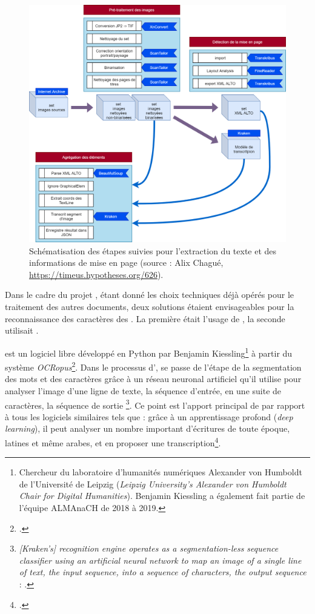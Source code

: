 \begin{figure}[t]
    \centering
    \includegraphics[width=15cm]{img/schema_lse_od2m.png}
    \caption[Schématisation des étapes suivies pour l’extraction du texte et des informations de mise en page]{Schématisation des étapes suivies pour l’extraction du texte et des informations de mise en page (source : Alix Chagué, \url{https://timeus.hypotheses.org/626}).}
    \label{fig:schema_lse_od2m}
\end{figure}

Dans le cadre du projet \timeus, étant donné les choix techniques déjà opérés pour le traitement des autres documents, deux solutions étaient envisageables pour la reconnaissance des caractères des \odm. La première était l'usage de \transkribus{}, la seconde utilisait \kraken{}.

\kraken{} est un logiciel libre développé en Python par Benjamin Kiessling\footnote{Chercheur du laboratoire d'humanités numériques \og Alexander von Humboldt \fg{} de l'Université de Leipzig (\textit{Leipzig  University’s  Alexander  von  Humboldt  Chair for Digital Humanities}). Benjamin Kiessling a également fait partie de l'équipe ALMAnaCH de 2018 à 2019.} à partir du système \textit{OCRopus}\footcite{kiessling}. Dans le processus d'\ocr, \kraken{} se passe de l'étape de la segmentation des mots et des caractères grâce à un \og réseau neuronal artificiel \fg{} qu'il utilise \og pour analyser l'image d'une ligne de texte, la séquence d'entrée, en une suite de caractères, la séquence de sortie \fg{}\footnote{\og \textit{[Kraken's] recognition engine operates as a segmentation-less sequence classifier using an artificial neural network to map an image of a single line of text, the input sequence, into a sequence of characters, the output sequence} : \cite{kiessling}.}. Ce point est l'apport principal de \kraken{} par rapport à tous les logiciels similaires tels que \transkribus{} : grâce à un apprentissage profond (\textit{deep learning}), il peut analyser un nombre important d'écritures de toute époque, latines et même arabes, et en proposer une transcription\footcite{kiesslingarabe}.

